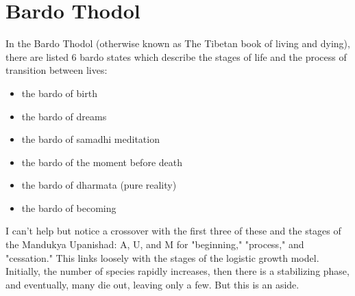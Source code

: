 %
%
%

\section*{Bardo Thodol}

 In the Bardo Thodol (otherwise known as The Tibetan book of living and dying), there are listed 6 bardo states which describe the stages of life and the process of transition between lives:

\begin{itemize} \item the bardo of birth \item the bardo of dreams \item the bardo of samadhi meditation \item the bardo of the moment before death \item the bardo of dharmata (pure reality) \item the bardo of becoming \end{itemize}

I can't help but notice a crossover with the first three of these and the stages of the Mandukya Upanishad: A, U, and M for "beginning," "process," and "cessation." This links loosely with the stages of the logistic growth model. Initially, the number of species rapidly increases, then there is a stabilizing phase, and eventually, many die out, leaving only a few. But this is an aside.

